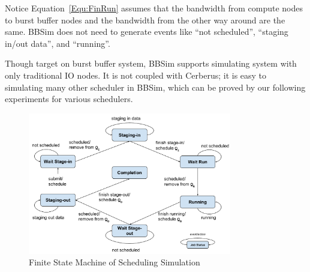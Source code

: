 Notice Equation~\ref{Equ:FinRun} assumes that the bandwidth from compute nodes to
burst buffer nodes and the bandwidth from the other way around are the same.
BBSim does not need to generate events like ``not scheduled'',
``staging in/out data'', and ``running''.

Though target on burst buffer system, BBSim supports simulating system with only
traditional IO nodes.
It is not coupled with Cerberus; it is easy to simulating many other scheduler in BBSim,
which can be proved by our following experiments for various schedulers.

\begin{figure}[!t]
        \centering
        \includegraphics[width=3.5in]{3PhaseJobFSM}
        \caption{Finite State Machine of Scheduling Simulation}
        \label{Fig:JobFSM}
\end{figure}


